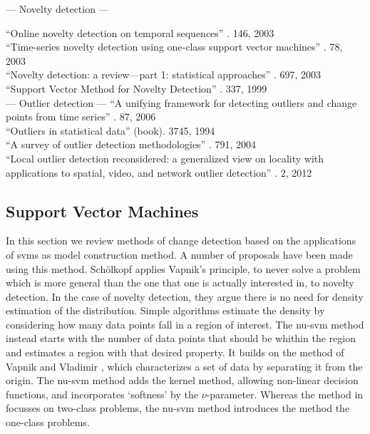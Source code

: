 --- Novelty detection ---

``Online novelty detection on temporal sequences'' \cite{ma2003online}. 146, 2003 \\
``Time-series novelty detection using one-class support vector machines'' \cite{ma2003time}. 78, 2003 \\

``Novelty detection: a review—part 1: statistical approaches'' \cite{markou2003novelty}. 697, 2003 \\

``Support Vector Method for Novelty Detection'' \cite{scholkopf1999support}. 337, 1999 \\


--- Outlier detection ---
``A unifying framework for detecting outliers and change points from time series'' \cite{takeuchi2006unifying}. 87, 2006 \\

``Outliers in statistical data'' \cite{barnett1994outliers} (book). 3745, 1994 \\

``A survey of outlier detection methodologies'' \cite{hodge2004survey}. 791, 2004 \\

``Local outlier detection reconsidered: a generalized view on locality with applications to spatial, video, and network outlier detection'' \cite{schubert2012local}. 2, 2012 \\


\subsection{Support Vector Machines}\label{subsec:svm}
In this section we review methods of change detection based on the applications of \glspl{svm} as model construction method.
A number of proposals have been made using this method.
Sch{\"o}lkopf \etal \cite{scholkopf1999support} applies Vapnik's principle, to never solve a problem which is more general than the one that one is actually interested in, to novelty detection.
In the case of novelty detection, they argue there is no need for density estimation of the distribution.
Simple algorithms estimate the density by considering how many data points fall in a region of interest.
The \gls{nu-svm} method instead starts with the number of data points that should be whithin the region and estimates a region with that desired property.
It builds on the method of Vapnik and Vladimir \cite{vapnik1963pattern}, which characterizes a set of data by separating it from the origin.
The \gls{nu-svm} method adds the kernel method, allowing non-linear decision functions, and incorporates `softness' by the $\nu$-parameter.
Whereas the method in \cite{vapnik1963pattern} focusses on two-class problems, the \gls{nu-svm} method introduces the method the one-class problems.

